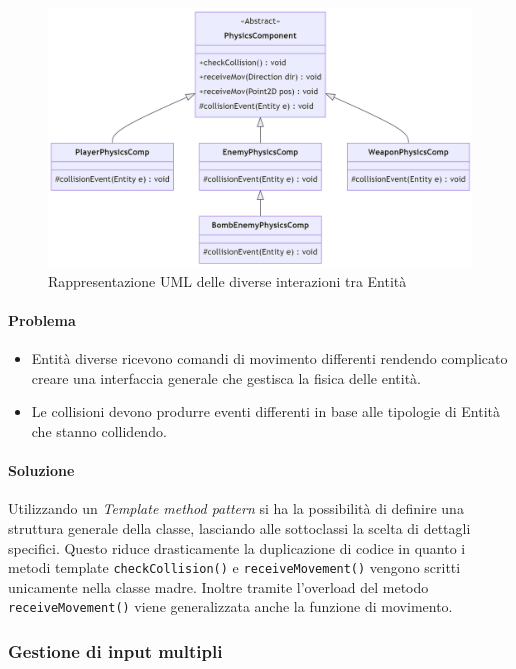 \documentclass[a4paper,12pt]{report}
\begin{document}
\begin{figure}[H]
\centering{}
\includegraphics[width=1\textwidth,keepaspectratio]{img/PhysicsComponentUML.png}
\caption{Rappresentazione UML delle diverse interazioni tra Entità}
\end{figure}

\paragraph{Problema}
\begin{itemize}
    \item Entità diverse ricevono comandi di movimento differenti rendendo complicato creare una interfaccia generale che gestisca la fisica delle entità.
    \item Le collisioni devono produrre eventi differenti in base alle tipologie di Entità che stanno collidendo.
\end{itemize}

\paragraph{Soluzione}
    Utilizzando un \textit{Template method pattern} si ha la possibilità di definire una struttura generale della classe, lasciando alle sottoclassi la scelta di dettagli specifici. Questo riduce drasticamente la duplicazione di codice in quanto i metodi template \texttt{checkCollision()} e \texttt{receiveMovement()} vengono scritti unicamente nella classe madre. Inoltre tramite l'overload del metodo \texttt{receiveMovement()} viene generalizzata anche la funzione di movimento.
    
\subsubsection{Gestione di input multipli}
\end{document}
